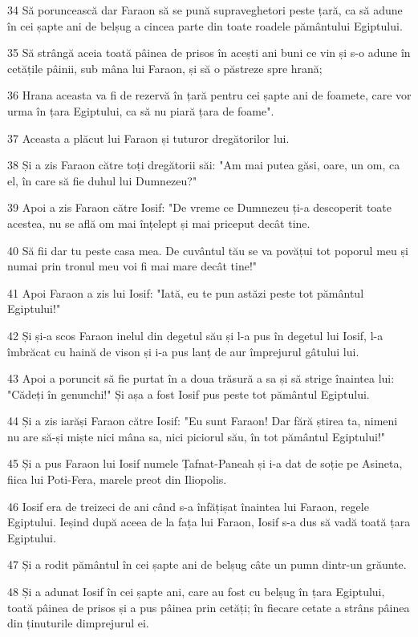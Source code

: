 \par 34 Să poruncească dar Faraon să se pună supraveghetori peste țară, ca să adune în cei șapte ani de belșug a cincea parte din toate roadele pământului Egiptului.
\par 35 Să strângă aceia toată pâinea de prisos în acești ani buni ce vin și s-o adune în cetățile pâinii, sub mâna lui Faraon, și să o păstreze spre hrană;
\par 36 Hrana aceasta va fi de rezervă în țară pentru cei șapte ani de foamete, care vor urma în țara Egiptului, ca să nu piară țara de foame".
\par 37 Aceasta a plăcut lui Faraon și tuturor dregătorilor lui.
\par 38 Și a zis Faraon către toți dregătorii săi: "Am mai putea găsi, oare, un om, ca el, în care să fie duhul lui Dumnezeu?"
\par 39 Apoi a zis Faraon către Iosif: "De vreme ce Dumnezeu ți-a descoperit toate acestea, nu se află om mai înțelept și mai priceput decât tine.
\par 40 Să fii dar tu peste casa mea. De cuvântul tău se va povățui tot poporul meu și numai prin tronul meu voi fi mai mare decât tine!"
\par 41 Apoi Faraon a zis lui Iosif: "Iată, eu te pun astăzi peste tot pământul Egiptului!"
\par 42 Și și-a scos Faraon inelul din degetul său și l-a pus în degetul lui Iosif, l-a îmbrăcat cu haină de vison și i-a pus lanț de aur împrejurul gâtului lui.
\par 43 Apoi a poruncit să fie purtat în a doua trăsură a sa și să strige înaintea lui: "Cădeți în genunchi!" Și așa a fost Iosif pus peste tot pământul Egiptului.
\par 44 Și a zis iarăși Faraon către Iosif: "Eu sunt Faraon! Dar fără știrea ta, nimeni nu are să-și miște nici mâna sa, nici piciorul său, în tot pământul Egiptului!"
\par 45 Și a pus Faraon lui Iosif numele Țafnat-Paneah și i-a dat de soție pe Asineta, fiica lui Poti-Fera, marele preot din Iliopolis.
\par 46 Iosif era de treizeci de ani când s-a înfățișat înaintea lui Faraon, regele Egiptului. Ieșind după aceea de la fața lui Faraon, Iosif s-a dus să vadă toată țara Egiptului.
\par 47 Și a rodit pământul în cei șapte ani de belșug câte un pumn dintr-un grăunte.
\par 48 Și a adunat Iosif în cei șapte ani, care au fost cu belșug în țara Egiptului, toată pâinea de prisos și a pus pâinea prin cetăți; în fiecare cetate a strâns pâinea din ținuturile dimprejurul ei.
